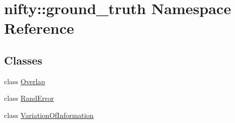 \hypertarget{namespacenifty_1_1ground__truth}{}\section{nifty\+:\+:ground\+\_\+truth Namespace Reference}
\label{namespacenifty_1_1ground__truth}
\subsection*{Classes}
\begin{DoxyCompactItemize}
\item 
class \hyperlink{classnifty_1_1ground__truth_1_1Overlap}{Overlap}
\item 
class \hyperlink{classnifty_1_1ground__truth_1_1RandError}{Rand\+Error}
\item 
class \hyperlink{classnifty_1_1ground__truth_1_1VariationOfInformation}{Variation\+Of\+Information}
\end{DoxyCompactItemize}
